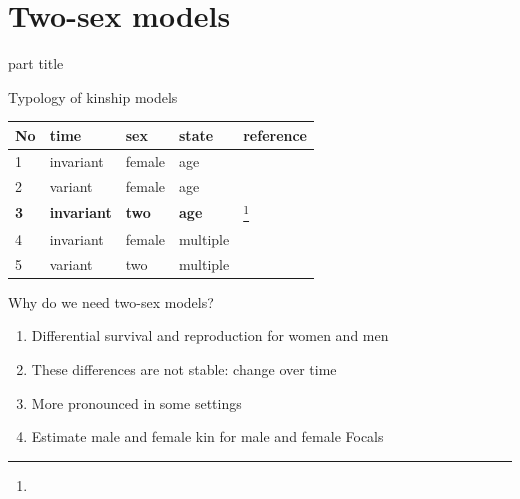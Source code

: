 ﻿\documentclass{beamer}
\newcommand{\fcite}[1]{\footnote{\fullcite{#1}}}
\begin{document}
\section{Two-sex models}
\begin{frame}
    \begin{centering}
    \begin{beamercolorbox}[sep=12pt,center]{part title}
    \insertsection\par
    \end{beamercolorbox}
    \end{centering}
\end{frame}

\begin{frame}{Typology of kinship models}
\begin{table}[]
\begin{tabular}{@{}lllll@{}}
\toprule
No & time      & sex    & state    & reference \\ \midrule
1 & invariant & female & age & \\ 
2 & variant   & female & age & \\
\textbf{3} & \textbf{invariant} & \textbf{two}   & \textbf{age} & \fcite{caswell_formal_2022} \\
4 & invariant   & female   &  multiple & \\ 
5 & variant   & two   &  multiple & \\ \bottomrule
\end{tabular}
\end{table}
\end{frame}

\begin{frame}{Why do we need two-sex models?}
    \begin{enumerate}
        \item Differential survival and reproduction for women and men
        \item These differences are not stable: change over time
        \item More pronounced in some settings
        \item Estimate male and female kin for  male and female Focals
    \end{enumerate}
\end{frame}
\end{document}
